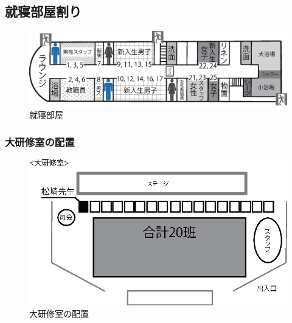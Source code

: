 \subsection{就寝部屋割り}
\begin{figure}[H]
\begin{center}
\includegraphics[scale=0.5]{./10/syushin.eps}
\caption{就寝部屋}
\label{fig:shushin}
\end{center}
\end{figure}

\subsubsection{大研修室の配置}
\begin{figure}[H]
 \begin{center}
  \includegraphics[width=130mm]{./03/nyushoshiki.eps}
  \end{center}
 \caption{大研修室の配置}
 \label{fig:daikenshuhaichi}
\end{figure}

